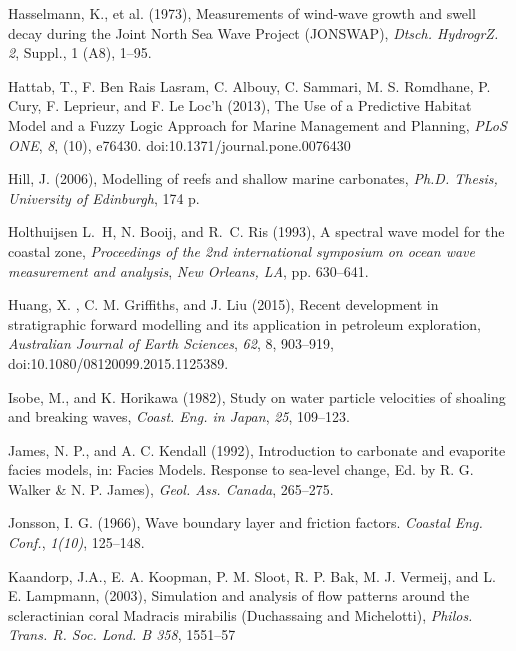 \documentclass[default,jgrga]{agutex2015}
\begin{document}
\begin{article}
\begin{thebibliography}{}
Hasselmann, K., et al. (1973), Measurements of wind-wave growth and swell decay during the Joint North Sea Wave Project (JONSWAP), \textit{Dtsch. HydrogrZ. 2}, Suppl., 1 (A8), 1--95.

Hattab, T., F. Ben Rais Lasram, C. Albouy, C. Sammari, M. S. Romdhane, P. Cury, F. Leprieur, and F. Le Loc'h (2013), The Use of a Predictive Habitat Model and a Fuzzy Logic Approach for Marine Management and Planning, \textit{PLoS ONE}, \textit{8}, (10), e76430. doi:10.1371/journal.pone.0076430

Hill, J. (2006), Modelling of reefs and shallow marine carbonates, \textit{Ph.D. Thesis, University of Edinburgh}, 174 p.

Holthuijsen L.~H, N. Booij, and R.~C. Ris (1993), A spectral wave model for the coastal zone, \textit{Proceedings of the 2nd international symposium on ocean wave measurement and analysis}, \textit{New Orleans, LA}, pp. 630--641.

Huang, X. , C. M. Griffiths, and J. Liu (2015), Recent development in stratigraphic forward modelling and its application in petroleum exploration, \textit{Australian Journal of Earth Sciences}, \textit{62}, 8, 903--919, doi:10.1080/08120099.2015.1125389.

Isobe, M., and K. Horikawa (1982), Study on water particle velocities of shoaling and breaking waves,  \textit{Coast. Eng. in Japan},  \textit{25}, 109--123.

James, N. P., and A. C. Kendall (1992), Introduction to carbonate and evaporite facies models, in: Facies Models. Response to sea-level change, Ed. by R. G. Walker \& N. P. James), \textit{Geol. Ass. Canada}, 265--275.

Jonsson, I. G. (1966), Wave boundary layer and friction factors. \textit{Coastal Eng. Conf.}, \textit{1(10)}, 125--148.

Kaandorp, J.A., E. A. Koopman, P. M. Sloot, R. P. Bak, M. J. Vermeij, and L. E. Lampmann, (2003), Simulation and analysis of flow patterns around the scleractinian coral Madracis mirabilis (Duchassaing and Michelotti), \textit{Philos. Trans. R. Soc. Lond. B 358}, 1551--57


\end{thebibliography}
\end{article}
\end{document}
